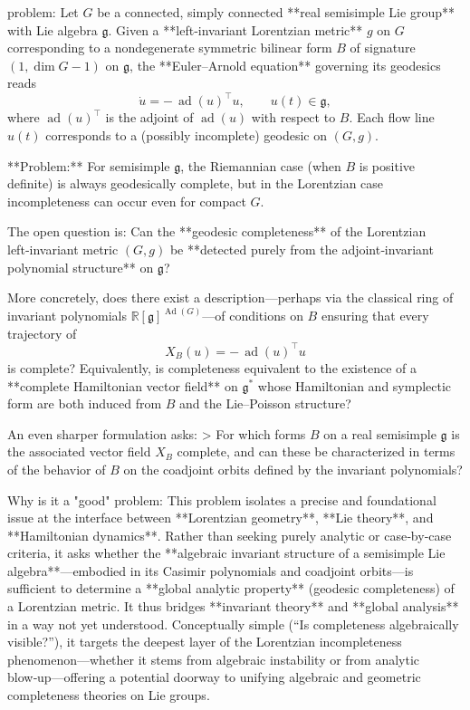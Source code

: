 problem:  
Let \(G\) be a connected, simply connected **real semisimple Lie group** with Lie algebra \(\mathfrak{g}\).  
Given a **left‑invariant Lorentzian metric** \(g\) on \(G\) corresponding to a nondegenerate symmetric bilinear form \(B\) of signature \((1,\dim G-1)\) on \(\mathfrak g\), the **Euler–Arnold equation** governing its geodesics reads  
\[
\dot{u} = -\,\operatorname{ad}(u)^{\top}u,\qquad u(t)\in\mathfrak g,
\]
where \(\operatorname{ad}(u)^{\top}\) is the adjoint of \(\operatorname{ad}(u)\) with respect to \(B\).  
Each flow line \(u(t)\) corresponds to a (possibly incomplete) geodesic on \((G,g)\).  

**Problem:**  
For semisimple \(\mathfrak g\), the Riemannian case (when \(B\) is positive definite) is always geodesically complete, but in the Lorentzian case incompleteness can occur even for compact \(G\).  

The open question is:  
Can the **geodesic completeness** of the Lorentzian left‑invariant metric \((G,g)\) be **detected purely from the adjoint‑invariant polynomial structure** on \(\mathfrak g\)?  

More concretely, does there exist a description—perhaps via the classical ring of invariant polynomials \(\mathbb R[\mathfrak g]^{\operatorname{Ad}(G)}\)—of conditions on \(B\) ensuring that every trajectory of  
\[
X_B(u) = -\,\operatorname{ad}(u)^{\top}u
\]
is complete?  Equivalently, is completeness equivalent to the existence of a **complete Hamiltonian vector field** on \(\mathfrak g^{*}\) whose Hamiltonian and symplectic form are both induced from \(B\) and the Lie–Poisson structure?  

An even sharper formulation asks:  
> For which forms \(B\) on a real semisimple \(\mathfrak g\) is the associated vector field \(X_B\) complete, and can these be characterized in terms of the behavior of \(B\) on the coadjoint orbits defined by the invariant polynomials?

Why is it a "good" problem:  
This problem isolates a precise and foundational issue at the interface between **Lorentzian geometry**, **Lie theory**, and **Hamiltonian dynamics**. Rather than seeking purely analytic or case‑by‑case criteria, it asks whether the **algebraic invariant structure of a semisimple Lie algebra**—embodied in its Casimir polynomials and coadjoint orbits—is sufficient to determine a **global analytic property** (geodesic completeness) of a Lorentzian metric. It thus bridges **invariant theory** and **global analysis** in a way not yet understood. Conceptually simple (“Is completeness algebraically visible?”), it targets the deepest layer of the Lorentzian incompleteness phenomenon—whether it stems from algebraic instability or from analytic blow‑up—offering a potential doorway to unifying algebraic and geometric completeness theories on Lie groups.